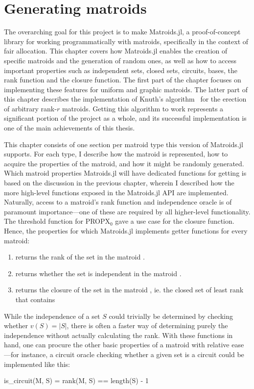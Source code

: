\chapter{Generating matroids}
\label{chap:generating_matroids}
The overarching goal for this project is to make Matroids.jl, a proof-of-concept library for working programmatically with matroids, specifically in the context of fair allocation. This chapter covers how Matroids.jl enables the creation of specific matroids and the generation of random ones, as well as how to access important properties such as independent sets, closed sets, circuits, bases, the rank function and the closure function. The first part of the chapter focuses on implementing these features for uniform and graphic matroids. The latter part of this chapter describes the implementation of Knuth's algorithm~\cite{knuth-1975} for the erection of arbitrary rank-$r$ matroids. Getting this algorithm to work represents a significant portion of the project as a whole, and its successful implementation is one of the main achievements of this thesis.

This chapter consists of one section per matroid type this version of Matroids.jl supports. For each type, I describe how the matroid is represented, how to acquire the properties of the matroid, and how it might be randomly generated. Which matroid properties Matroids.jl will have dedicated functions for getting is based on the discussion in the previous chapter, wherein I described how the more high-level functions exposed in the Matroids.jl API are implemented. Naturally, access to a matroid's rank function and independence oracle is of paramount importance---one of these are required by all higher-level functionality. The threshold function for PROPX$_0$ gave a use case for the closure function. Hence, the properties for which Matroids.jl implements getter functions for every matroid: 
\begin{enumerate}
  \item {} returns the rank of the set  in the matroid .
  \item {} returns whether the set  is independent in the matroid .
  \item {} returns the closure of the set  in the matroid , ie. the closed set of least rank that contains 
\end{enumerate}
While the independence of a set $S$ could trivially be determined by checking whether $v(S) = |S|$, there is often a faster way of determining purely the independence without actually calculating the rank. With these functions in hand, one can procure the other basic properties of a matroid with relative ease---for instance, a circuit oracle checking whether a given set is a circuit could be implemented like this:
\begin{jllisting}
is_circuit(M, S) = rank(M, S) == length(S) - 1
\end{jllisting}



